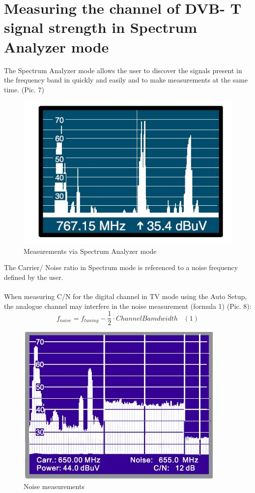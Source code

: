 \documentclass[english]{article}
\begin{document}
\section{Measuring the channel of DVB- T signal strength in Spectrum Analyzer mode}
The Spectrum Analyzer mode allows the user to discover the signals present in the frequency band in quickly and easily and to make measurements at the same time. (Pic. 7)
\begin{figure}
\centerline{\includegraphics[scale=.8]{DTV/Pic7}}
\caption{Measurements via Spectrum Analyzer mode}
\end{figure}
The Carrier/ Noise ratio in Spectrum mode is referenced to a noise frequency defined by the user.\\\\
When measuring C/N for the digital channel in TV mode using the Auto Setup, the analogue channel may interfere in the noise measurement (formula 1) (Pic. 8):
$$
f_{noise}= f_{tuning}- \frac{1}{2} \cdot Channel Bamdwidth \;\;\;(1)
$$
\begin{figure}
\centerline{\includegraphics[scale=.8]{DTV/Pic8}}
\caption{Noise measurements}
\end{figure}
\end{document}
